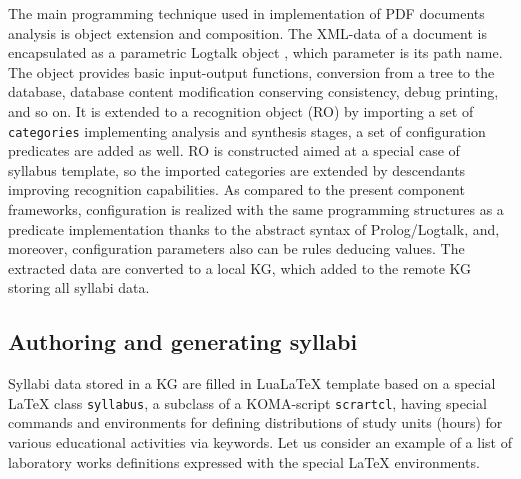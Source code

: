 \documentclass[
]{aiitart}
\providecommand{\LuaLaTeX}{Lua\LaTeX}
\begin{document}
The main programming technique used in implementation of PDF documents analysis is object extension and composition.  The XML-data of a document is encapsulated as a parametric Logtalk object \cite{logtalk}, which parameter is its path name.  The object provides basic input-output functions, conversion from a tree to the database, database content modification conserving consistency, debug printing, and so on.  It is extended to a recognition object (RO) by importing a set of \verb|categories| implementing analysis and synthesis stages, a set of configuration predicates are added as well.  RO is constructed aimed at a special case of syllabus template, so the imported categories are extended by descendants improving recognition capabilities.  As compared to the present component frameworks, configuration is realized with the same programming structures as a predicate implementation thanks to the abstract syntax of Prolog/Logtalk, and, moreover, configuration parameters also can be rules deducing values.  The extracted data are converted to a local KG, which added to the remote KG storing all syllabi data.

\subsection{Authoring and generating syllabi}

Syllabi data stored in a KG are filled in \LuaLaTeX{} template based on a special \LaTeX{} class \verb|syllabus|, a subclass of a KOMA-script \verb|scrartcl|, having special commands and environments for defining distributions of study units (hours) for various educational activities via keywords.  Let us consider an example of a list of laboratory works definitions expressed with the special \LaTeX{} environments.
\end{document}
